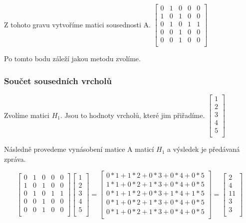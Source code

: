 Z tohoto gravu vytvoříme matici sousednosti A.
$\left[ \begin{matrix}
0 & 1 & 0 & 0 & 0 \\
1 & 0 & 1 & 0 & 0 \\
0 & 1 & 0 & 1 & 1 \\
0 & 0 & 1 & 0 & 0 \\
0 & 0 & 1 & 0 & 0 \\
\end{matrix} \right]$ 

Po tomto bodu záleží jakou metodu zvolíme.

\subsubsection{Součet sousedních vrcholů}

Zvolíme matici $H_1$. Jsou to hodnoty vrcholů, které jim přiřadíme.
$\left[ \begin{matrix}
1 \\
2 \\
3 \\
4 \\
5 \\
\end{matrix} \right]$

Následně provedeme vynásobení matice A maticí $H_1$ a výsledek je předávaná zpráva.

\[\left[ \begin{matrix}
0 & 1 & 0 & 0 & 0 \\
1 & 0 & 1 & 0 & 0 \\
0 & 1 & 0 & 1 & 1 \\
0 & 0 & 1 & 0 & 0 \\
0 & 0 & 1 & 0 & 0 \\
\end{matrix} \right]
\left[ \begin{matrix}
1 \\
2 \\
3 \\
4 \\
5 \\
\end{matrix} \right] = 
\left[ \begin{matrix}
0*1+1*2+0*3+0*4+0*5 \\
1*1+0*2+1*3+0*4+0*5 \\
0*1+1*2+0*3+1*4+1*5 \\
0*1+0*2+1*3+0*4+0*5 \\
0*1+0*2+1*3+0*4+0*5 \\
\end{matrix} \right] = 
\left[ \begin{matrix}
2 \\
4 \\
11 \\
3 \\
3 \\
\end{matrix} \right]\] 

